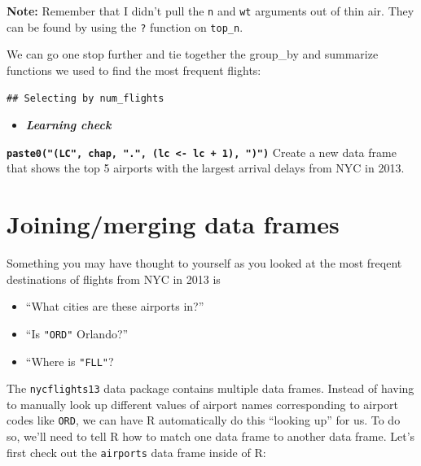\documentclass[]{tufte-book}
\newenvironment{Shaded}{\begin{snugshade}}{\end{snugshade}}
\newcommand{\KeywordTok}[1]{\textcolor[rgb]{0.13,0.29,0.53}{\textbf{{#1}}}}
\newcommand{\DataTypeTok}[1]{\textcolor[rgb]{0.13,0.29,0.53}{{#1}}}
\newcommand{\DecValTok}[1]{\textcolor[rgb]{0.00,0.00,0.81}{{#1}}}
\newcommand{\StringTok}[1]{\textcolor[rgb]{0.31,0.60,0.02}{{#1}}}
\newcommand{\NormalTok}[1]{{#1}}
\providecommand{\tightlist}{%
  \setlength{\itemsep}{0pt}\setlength{\parskip}{0pt}}
\newenvironment{rmdblock}[1]
  {\begin{shaded*}
  \begin{itemize}
  \renewcommand{\labelitemi}{
    \raisebox{-.7\height}[0pt][0pt]{
    }
  }
  \item
  }
  {
  \end{itemize}
  \end{shaded*}
  }
\newenvironment{learncheck}
  {\begin{rmdblock}{warning}}
  {\end{rmdblock}}
\begin{document}
\textbf{Note:} Remember that I didn't pull the \texttt{n} and
\texttt{wt} arguments out of thin air. They can be found by using the
\texttt{?} function on \texttt{top\_n}.

We can go one stop further and tie together the group\_by and summarize
functions we used to find the most frequent flights:

\begin{Shaded}
\end{Shaded}

\begin{verbatim}
## Selecting by num_flights
\end{verbatim}

\begin{learncheck}
\textbf{\emph{Learning check}}
\end{learncheck}

\textbf{\texttt{paste0("(LC",\ chap,\ ".",\ (lc\ \textless{}-\ lc\ +\ 1),\ ")")}}
Create a new data frame that shows the top 5 airports with the largest
arrival delays from NYC in 2013.

\section{Joining/merging data frames}\label{joiningmerging-data-frames}

Something you may have thought to yourself as you looked at the most
freqent destinations of flights from NYC in 2013 is

\begin{itemize}
\tightlist
\item
  ``What cities are these airports in?''
\item
  ``Is \texttt{"ORD"} Orlando?''
\item
  ``Where is \texttt{"FLL"}?
\end{itemize}

The \texttt{nycflights13} data package contains multiple data frames.
Instead of having to manually look up different values of airport names
corresponding to airport codes like \texttt{ORD}, we can have R
automatically do this ``looking up'' for us. To do so, we'll need to
tell R how to match one data frame to another data frame. Let's first
check out the \texttt{airports} data frame inside of R:
\end{document}
